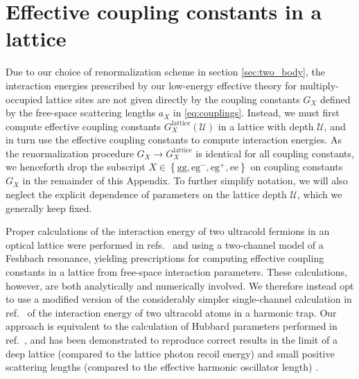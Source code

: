 \documentclass[preprint,showkeys,nofootinbib]{revtex4-1}
\renewcommand{\t}{\text} %
\newcommand{\p}[1]{\left(#1\right)} %
\renewcommand{\set}[1]{\left\{#1\right\}} %
\newcommand{\g}{\text{g}}
\newcommand{\e}{\text{e}}
\newcommand{\U}{\mathcal{U}}
\newcommand{\1}{\mathds{1}}
\begin{document}
\section{Effective coupling constants in a lattice}
\label{sec:renormalization}

Due to our choice of renormalization scheme in section
\ref{sec:two_body}, the interaction energies prescribed by our
low-energy effective theory for multiply-occupied lattice sites are
not given directly by the coupling constants $G_X$ defined by the
free-space scattering lengths $a_X$ in \eqref{eq:couplings}.  Instead,
we must first compute effective coupling constants
$G_X^{\t{lattice}}\p{\U}$ in a lattice with depth $\U$, and in turn
use the effective coupling constants to compute interaction energies.
As the renormalization procedure $G_X\to G_X^{\t{lattice}}$ is
identical for all coupling constants, we henceforth drop the subscript
$X\in\set{\g\g,\e\g^-,\e\g^+,\e\e}$ on coupling constants $G_X$ in the
remainder of this Appendix.  To further simplify notation, we will
also neglect the explicit dependence of parameters on the lattice
depth $\U$, which we generally keep fixed.

Proper calculations of the interaction energy of two ultracold
fermions in an optical lattice were performed in
refs.~\cite{wall2013strongly} and \cite{buchler2010microscopic} using
a two-channel model of a Feshbach resonance, yielding prescriptions
for computing effective coupling constants in a lattice from
free-space interaction parameters.  These calculations, however, are
both analytically and numerically involved.  We therefore instead opt
to use a modified version of the considerably simpler single-channel
calculation in ref.~\cite{busch1998two} of the interaction energy of
two ultracold atoms in a harmonic trap.  Our approach is equivalent to
the calculation of Hubbard parameters performed in
ref.~\cite{dickerscheid2005feshbach}, and has been demonstrated to
reproduce correct results in the limit of a deep lattice (compared to
the lattice photon recoil energy) and small positive scattering
lengths (compared to the effective harmonic oscillator length)
\cite{buchler2010microscopic}.
\end{document}
